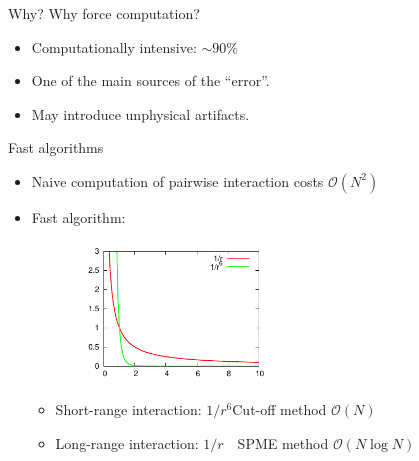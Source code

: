\documentclass{beamer}
\newcommand{\redc}[1]{{\color{red} #1}}
\newcommand{\bluec}[1]{{\color{blue} #1}}
\begin{document}
\begin{frame}{Why?}
  Why force computation?
  \begin{itemize}\itemsep 3pt
  \item <2->Computationally intensive: \redc{$ \sim 90 \%$}
  \item <3->One of the main sources of the \redc{``error''}.
  \item <4->May introduce \redc{unphysical artifacts}.
  \end{itemize}
  \vfill
\end{frame}


\begin{frame}{Fast algorithms}
  \begin{itemize}
  \item<1-> Naive computation of pairwise interaction costs \redc{$\mathcal O(N^2)$}
  \item<2-> Fast algorithm:
    \begin{figure}
      \centering 
      \includegraphics[width=0.5\textwidth]{figs/long-range/decay.pdf}
    \end{figure}
    \begin{itemize}
    \item<3-> \redc{Short}-range interaction: \bluec{$1/r^6$}\quad Cut-off method \redc{$\mathcal O(N)$}
    \item<4-> \redc{Long}-range interaction: \bluec{$1/r$}\quad \ \ SPME method \redc{$\mathcal O(N \log N)$}
    \end{itemize}
  \end{itemize}
\end{frame}
\end{document}
